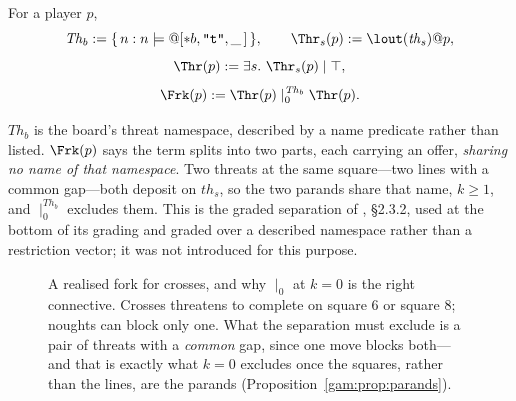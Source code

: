 \begin{definition}\label{gam:def:fork}
For a player $p$,
\[
\mathit{Th}_b := \{\, n : n \models @[*b,\texttt{"t"},\_\,] \,\}, \qquad
\Thr_s(p) := \lout(\mathit{th}_s)@p,
\]
\[
\Thr(p) := \exists s.\ \Thr_s(p) \mid \top,
\]
\[
\Frk(p) := \Thr(p) \mid_0^{\mathit{Th}_b} \Thr(p) .
\]
\end{definition}

$\mathit{Th}_b$ is the board's threat namespace, described by a name predicate
rather than listed. $\Frk(p)$ says the term splits into two parts, each carrying
an offer, \emph{sharing no name of that namespace}. Two threats at the same
square---two lines with a common gap---both deposit on $\mathit{th}_s$, so the
two parands share that name, $k \geq 1$, and $\mid_0^{\mathit{Th}_b}$ excludes
them. This is the graded separation of \cite{ClassifierNote}, \S2.3.2, used at the
bottom of its grading and graded over a described namespace rather than a
restriction vector; it was not introduced for this purpose.

\begin{figure}[t]
\centering
{}
\caption{A realised fork for crosses, and why $\mid_0$ at $k=0$ is the right
connective. Crosses threatens to complete on square $6$ or square $8$; noughts
can block only one. What the separation must exclude is a pair of threats with a
\emph{common} gap, since one move blocks both---and that is exactly what $k=0$
excludes once the squares, rather than the lines, are the parands
(Proposition~\ref{gam:prop:parands}).}
\label{gam:fig:fork}
\end{figure}

